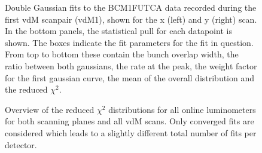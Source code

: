 \begin{figure}[!htb]
	\centering
	\caption[Double Gaussian fits for BCM1FUTCA]{Double Gaussian fits to the BCM1FUTCA data recorded during the first vdM scanpair (vdM1), shown for the x (left) and y (right) scan. In the bottom panels, the statistical pull for each datapoint is shown. The boxes indicate the fit parameters for the fit in question. From top to bottom these contain the bunch overlap width, the ratio between both gaussians, the rate at the peak, the weight factor for the first gaussian curve, the mean of the overall distribution and the reduced $\chi^2$.}
	\label{fig:fit_BCM1FUTCA_103}
\end{figure}

\begin{figure}[!htb]
	\centering
	\caption[Scan fits reduced $\chi^2$ distribution]{Overview of the reduced $\chi^2$ distributions for all online luminometers for both scanning planes and all vdM scans. Only converged fits are considered which leads to a slightly different total number of fits per detector.}
	\label{fig:chi2_distributions}
\end{figure}

